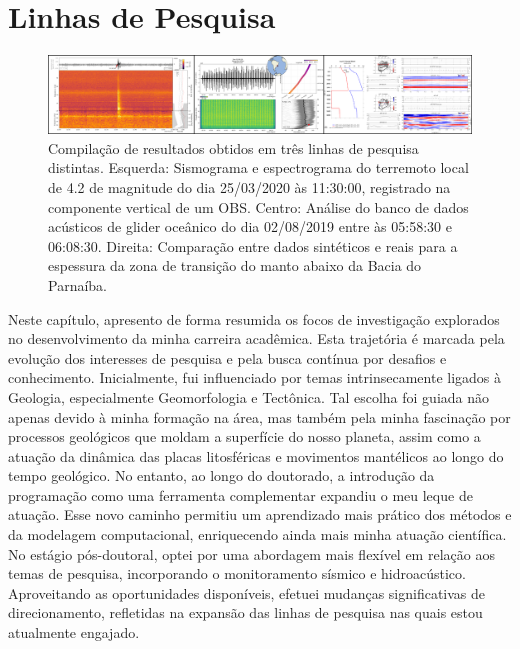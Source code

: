 \documentclass[10pt,a4paper,oneside]{book}
\newcommand{\HeroFigPad}{\vspace{-1cm}}
\begin{document}

\chapter{Linhas de Pesquisa}
\label{cap_pesquisa}

\begin{figure}[h]
  \HeroFigPad
  \begin{center}
    \includegraphics[width=\textwidth]{images/linhas_de_pesquisa.png}
  \end{center}
  \caption{
    Compilação de resultados obtidos em três linhas de pesquisa distintas. Esquerda: Sismograma e espectrograma do terremoto local de 4.2 de magnitude do dia 25/03/2020 às 11:30:00, registrado na componente vertical de um OBS. Centro: Análise do banco de dados acústicos de glider oceânico do dia 02/08/2019 entre às 05:58:30 e 06:08:30. Direita: Comparação entre dados sintéticos e reais para a  espessura da zona de transição do manto abaixo da Bacia do Parnaíba.
  }
\end{figure}

Neste capítulo, apresento de forma resumida os focos de investigação explorados no desenvolvimento da minha carreira acadêmica. Esta trajetória é marcada pela evolução dos interesses de pesquisa e pela busca contínua por desafios e conhecimento. Inicialmente, fui influenciado por temas intrinsecamente ligados à Geologia, especialmente Geomorfologia e Tectônica. Tal escolha foi guiada não apenas devido à minha formação na área, mas também pela minha fascinação por processos geológicos que moldam a superfície do nosso planeta, assim como a atuação da dinâmica das placas litosféricas e movimentos mantélicos ao longo do tempo geológico. No entanto, ao longo do doutorado, a introdução da programação como uma ferramenta complementar expandiu o meu leque de atuação. Esse novo caminho permitiu um aprendizado mais prático dos métodos e da modelagem computacional, enriquecendo ainda mais minha atuação científica. No estágio pós-doutoral, optei por uma abordagem mais flexível em relação aos temas de pesquisa, incorporando o monitoramento sísmico e hidroacústico. Aproveitando as oportunidades disponíveis, efetuei mudanças significativas de direcionamento, refletidas na expansão das linhas de pesquisa nas quais estou atualmente engajado. 
\end{document}

